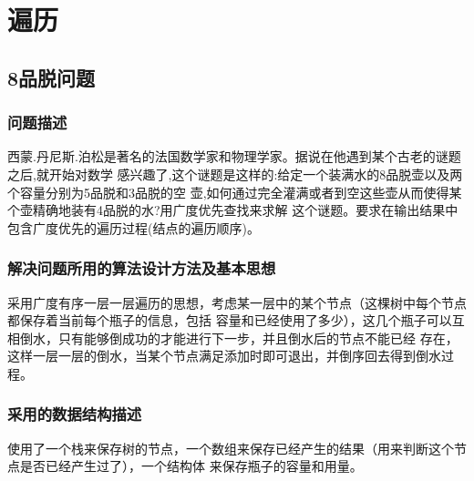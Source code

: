 \documentclass{ctexart}
\begin{document}
\newpage
\section{遍历}
\subsection{8品脱问题}
\subsubsection{问题描述}
西蒙.丹尼斯.泊松是著名的法国数学家和物理学家。据说在他遇到某个古老的谜题之后,就开始对数学
感兴趣了,这个谜题是这样的:给定一个装满水的8品脱壶以及两个容量分别为5品脱和3品脱的空
壶,如何通过完全灌满或者到空这些壶从而使得某个壶精确地装有4品脱的水?用广度优先查找来求解
这个谜题。要求在输出结果中包含广度优先的遍历过程(结点的遍历顺序)。
\subsubsection{解决问题所用的算法设计方法及基本思想}
采用广度有序一层一层遍历的思想，考虑某一层中的某个节点（这棵树中每个节点都保存着当前每个瓶子的信息，包括
容量和已经使用了多少），这几个瓶子可以互相倒水，只有能够倒成功的才能进行下一步，并且倒水后的节点不能已经
存在，这样一层一层的倒水，当某个节点满足添加时即可退出，并倒序回去得到倒水过程。
\subsubsection{采用的数据结构描述}
使用了一个栈来保存树的节点，一个数组来保存已经产生的结果（用来判断这个节点是否已经产生过了），一个结构体
来保存瓶子的容量和用量。
\end{document}
